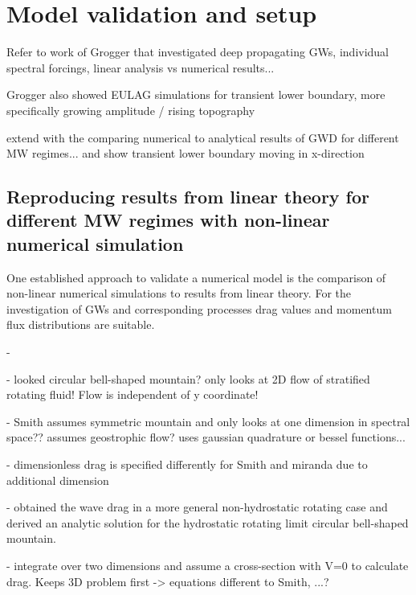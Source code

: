 \chapter{Model validation and setup}

Refer to work of Grogger that investigated deep propagating GWs, individual spectral forcings, linear analysis vs numerical results...

Grogger also showed EULAG simulations for transient lower boundary, more specifically growing amplitude / rising topography 

extend with the comparing numerical to analytical results of GWD for different MW regimes...
and show transient lower boundary moving in x-direction


\section{Reproducing results from linear theory for different MW regimes with non-linear numerical simulation}


One established approach to validate a numerical model is the comparison of non-linear numerical simulations to results from linear theory. For the investigation of GWs and corresponding processes drag values and momentum flux distributions are suitable.


- \textcite{bretherton_momentum_1969}

- \textcite{smith_influence_1979} looked circular bell-shaped mountain? only looks at 2D flow of stratified rotating fluid! Flow is independent of y coordinate! 

- Smith assumes symmetric mountain and only looks at one dimension in spectral space?? assumes geostrophic flow? uses gaussian quadrature or bessel functions...

- dimensionless drag is specified differently for Smith and miranda due to additional dimension

- \textcite{miranda_non-linear_1992} obtained the wave drag in a more general non-hydrostatic rotating case and derived an analytic solution for the hydrostatic rotating limit circular bell-shaped mountain. 

- integrate over two dimensions and assume a cross-section with V=0 to calculate drag. Keeps 3D problem first -> equations different to Smith, ...?

